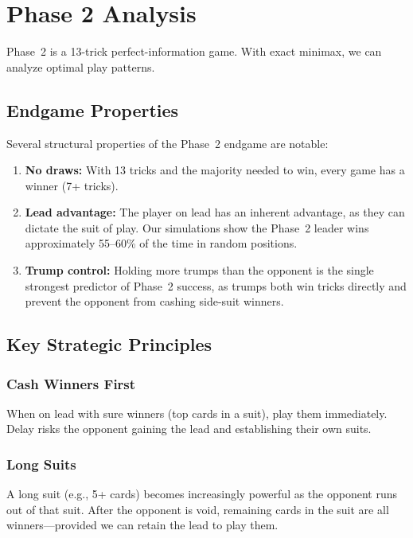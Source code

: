 \section{Phase 2 Analysis}
\label{sec:phase2}

Phase~2 is a 13-trick perfect-information game. With exact minimax, we can
analyze optimal play patterns.

\subsection{Endgame Properties}

Several structural properties of the Phase~2 endgame are notable:

\begin{enumerate}
  \item \textbf{No draws:} With 13 tricks and the majority needed to win,
    every game has a winner (7+ tricks).
  \item \textbf{Lead advantage:} The player on lead has an inherent advantage,
    as they can dictate the suit of play. Our simulations show the Phase~2
    leader wins approximately 55--60\% of the time in random positions.
  \item \textbf{Trump control:} Holding more trumps than the opponent is the
    single strongest predictor of Phase~2 success, as trumps both win tricks
    directly and prevent the opponent from cashing side-suit winners.
\end{enumerate}

\subsection{Key Strategic Principles}

\subsubsection{Cash Winners First}

When on lead with sure winners (top cards in a suit), play them immediately.
Delay risks the opponent gaining the lead and establishing their own suits.

\subsubsection{Long Suits}

A long suit (e.g., 5+ cards) becomes increasingly powerful as the opponent
runs out of that suit. After the opponent is void, remaining cards in the
suit are all winners---provided we can retain the lead to play them.

